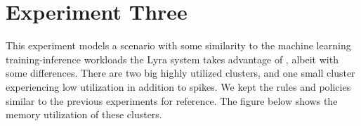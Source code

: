 \section{Experiment Three}

\begin{center}
\end{center}

This experiment models a scenario with some similarity to the machine learning
training-inference workloads the Lyra system takes advantage of
\cite{li_lyra_2023}, albeit with some differences. There are two big highly
utilized clusters, and one small cluster experiencing low utilization in
addition to spikes. We kept the rules and policies similar to the previous
experiments for reference. The figure below shows the memory utilization of
these clusters. 

